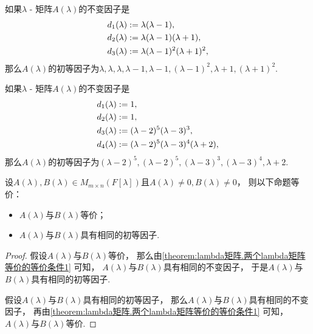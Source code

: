 \begin{example}
如果\(\lambda\) - 矩阵\(A(\lambda)\)的不变因子是\begin{align*}
	d_1(\lambda) &:= \lambda(\lambda-1), \\
	d_2(\lambda) &:= \lambda(\lambda-1)(\lambda+1), \\
	d_3(\lambda) &:= \lambda(\lambda-1)^2(\lambda+1)^2,
\end{align*}
那么\(A(\lambda)\)的初等因子为\(
	\lambda,
	\lambda,
	\lambda,
	\lambda-1,
	\lambda-1,
	(\lambda-1)^2,
	\lambda+1,
	(\lambda+1)^2
\).
\end{example}

\begin{example}
如果\(\lambda\) - 矩阵\(A(\lambda)\)的不变因子是\begin{align*}
	d_1(\lambda) &:= 1, \\
	d_2(\lambda) &:= 1, \\
	d_3(\lambda) &:= (\lambda-2)^5(\lambda-3)^3, \\
	d_4(\lambda) &:= (\lambda-2)^5(\lambda-3)^4(\lambda+2),
\end{align*}
那么\(A(\lambda)\)的初等因子为\(
	(\lambda-2)^5,
	(\lambda-2)^5,
	(\lambda-3)^3,
	(\lambda-3)^4,
	\lambda+2
\).
\end{example}

\begin{theorem}\label{theorem:lambda矩阵.两个lambda矩阵等价的等价条件2}
设\(A(\lambda), B(\lambda) \in M_{m \times n}(F[\lambda])\)且\(A(\lambda) \neq 0, B(\lambda) \neq 0\)，
则以下命题等价：\begin{itemize}
	\item \(A(\lambda)\)与\(B(\lambda)\)等价；
	\item \(A(\lambda)\)与\(B(\lambda)\)具有相同的初等因子.
\end{itemize}
\begin{proof}
假设\(A(\lambda)\)与\(B(\lambda)\)等价，
那么由\cref{theorem:lambda矩阵.两个lambda矩阵等价的等价条件1} 可知，
\(A(\lambda)\)与\(B(\lambda)\)具有相同的不变因子，
于是\(A(\lambda)\)与\(B(\lambda)\)具有相同的初等因子.

假设\(A(\lambda)\)与\(B(\lambda)\)具有相同的初等因子，
那么\(A(\lambda)\)与\(B(\lambda)\)具有相同的不变因子，
再由\cref{theorem:lambda矩阵.两个lambda矩阵等价的等价条件1} 可知，
\(A(\lambda)\)与\(B(\lambda)\)等价.
\end{proof}
\end{theorem}


